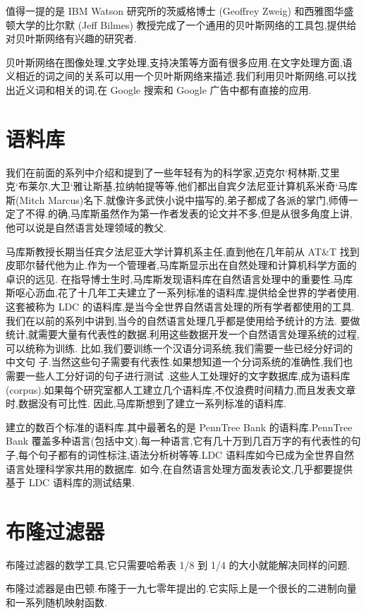 \documentclass{article}
\begin{document}
值得一提的是 IBM Watson 研究所的茨威格博士 (Geoffrey Zweig) 和西雅图华盛顿大学的比尔默 (Jeff Bilmes) 教授完成了一个通用的贝叶斯网络的工具包,提供给对贝叶斯网络有兴趣的研究者.

贝叶斯网络在图像处理,文字处理,支持决策等方面有很多应用.在文字处理方面,语义相近的词之间的关系可以用一个贝叶斯网络来描述.我们利用贝叶斯网络,可以找出近义词和相关的词,在 Google 搜索和 Google 广告中都有直接的应用.

\section{语料库}
我们在前面的系列中介绍和提到了一些年轻有为的科学家,迈克尔`柯林斯,艾里克`布莱尔,大卫`雅让斯基,拉纳帕提等等,他们都出自宾夕法尼亚计算机系米奇`马库斯(Mitch Marcus)名下.就像许多武侠小说中描写的,弟子都成了各派的掌门,师傅一定了不得.的确,马库斯虽然作为第一作者发表的论文并不多,但是从很多角度上讲,他可以说是自然语言处理领域的教父. 

马库斯教授长期当任宾夕法尼亚大学计算机系主任,直到他在几年前从 AT\&T 找到皮耶尔替代他为止.作为一个管理者,马库斯显示出在自然处理和计算机科学方面的卓识的远见.
在指导博士生时,马库斯发现语料库在自然语言处理中的重要性.马库斯呕心沥血,花了十几年工夫建立了一系列标准的语料库,提供给全世界的学者使用.
这套被称为 LDC 的语料库,是当今全世界自然语言处理的所有学者都使用的工具.我们在以前的系列中讲到,当今的自然语言处理几乎都是使用给予统计的方法.
要做统计,就需要大量有代表性的数据.利用这些数据开发一个自然语言处理系统的过程,可以统称为训练.
比如,我们要训练一个汉语分词系统,我们需要一些已经分好词的中文句 子.当然这些句子需要有代表性.如果想知道一个分词系统的准确性,我们也需要一些人工分好词的句子进行测试
.这些人工处理好的文字数据库,成为语料库 (corpus).如果每个研究室都人工建立几个语料库,不仅浪费时间精力,而且发表文章时,数据没有可比性.
因此,马库斯想到了建立一系列标准的语料库.

建立的数百个标准的语料库.其中最著名的是 PennTree Bank 的语料库.PennTree Bank 覆盖多种语言(包括中文).每一种语言,它有几十万到几百万字的有代表性的句子,每个句子都有的词性标注,语法分析树等等.LDC 语料库如今已成为全世界自然语言处理科学家共用的数据库.
如今,在自然语言处理方面发表论文,几乎都要提供基于 LDC 语料库的测试结果.

\section{布隆过滤器}
布隆过滤器的数学工具,它只需要哈希表 1/8 到 1/4 的大小就能解决同样的问题.

布隆过滤器是由巴顿.布隆于一九七零年提出的.它实际上是一个很长的二进制向量和一系列随机映射函数.
\end{document}
